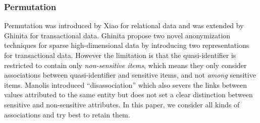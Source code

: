 \subsubsection{Permutation}

Permutation was introduced by Xiao \etal \cite{Xiao:2006:Anatomy} for
relational data and was extended by
Ghinita \etal \cite{2011:TKDE:Anonymous}
for transactional data.
Ghinita \etal propose two novel anonymization techniques for sparse
high-dimensional data by introducing two representations for transactional
data. However the limitation is that the quasi-identifier is restricted to
contain only {\em non-sensitive items}, which means they only
consider associations between quasi-identifier
and sensitive items, and not {\em among} sensitive items.
Manolis \etal \cite{terrovitis:privacy} introduced ``disassociation''
which also severs the links between values attributed to the
same entity but does not
set a clear distinction between sensitive and non-sensitive attributes.
In this paper, we consider all kinds of associations and try best to
retain them.
%

